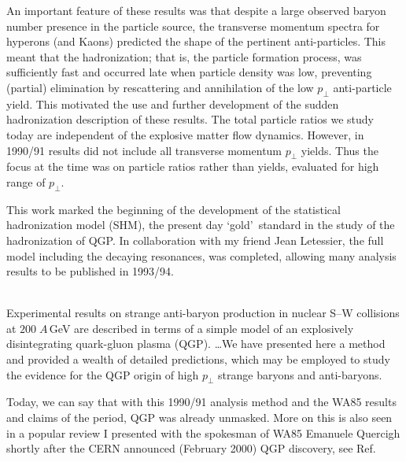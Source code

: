 An important feature of these results was that despite a large observed baryon number presence in the particle source, the transverse momentum spectra for hyperons (and Kaons) predicted the shape of the pertinent anti-particles. This meant that the hadronization; that is, the particle formation process, was sufficiently fast and occurred late when particle density was low, preventing (partial) elimination by rescattering and annihilation of the low $p_\bot$ anti-particle yield. This motivated the use and further development of the sudden hadronization description of these results. The total particle ratios we study today are independent of the explosive matter flow dynamics. However, in 1990/91 results did not include all transverse momentum $p_\bot$ yields. Thus the focus at the time was on particle ratios rather than yields, evaluated for high range of $p_\bot$.

This work marked the beginning of the development of the statistical hadronization model (SHM), the present day \lq gold\rq\ standard in the study of the hadronization of QGP. In collaboration with my friend Jean Letessier, the full model including the decaying resonances, was completed, allowing many analysis results to be published in 1993/94.\\
 
\\[-0.7cm]
%
\begin{mdframed}[linecolor=gray,roundcorner=12pt,backgroundcolor=Dandelion!15,linewidth=1pt,leftmargin=0cm,rightmargin=0cm,topline=true,bottomline=true,skipabove=12pt]
\relax
%
Experimental results on strange anti-baryon production in nuclear S--W collisions at $200\;A$\,GeV are described in terms of a simple model of an explosively disintegrating quark-gluon plasma (QGP). \ldots We have presented here a method and provided a wealth of detailed predictions, which may be employed to study the evidence for the QGP origin of high $p_\bot$ strange baryons and anti-baryons.
%
\end{mdframed}

Today, we can say that with this 1990/91 analysis method and the WA85 results and claims of the period, QGP was already unmasked. More on this is also seen in a popular review I presented with the spokesman of WA85 Emanuele Quercigh shortly after the CERN announced (February 2000) QGP discovery, see Ref.\,\cite{Quercigh:2000nwx}\\


